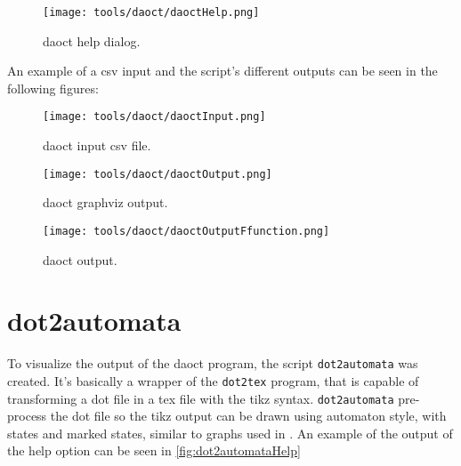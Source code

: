 \begin{figure}[H]
  \centering \texttt{[image: tools/daoct/daoctHelp.png]}
  \caption{daoct help dialog.}
  \label{fig:daoctHelp}
\end{figure}

An example of a csv input and the script's different outputs can
be seen in the following figures:
\vspace{-1cm}
\begin{figure}[H]
\begin{minipage}[H]{0.5\textwidth}
  \centering \texttt{[image: tools/daoct/daoctInput.png]}
  \caption{daoct input csv file.}
  \label{fig:daoctInput}
\end{minipage}
\begin{minipage}[H]{0.5\textwidth}
  \centering \texttt{[image: tools/daoct/daoctOutput.png]}
  \caption{daoct graphviz output.}
  \label{fig:daoctOutput}
\end{minipage}
\end{figure}  


\begin{figure}[H]
  \centering
  \texttt{[image: tools/daoct/daoctOutputFfunction.png]}
  \caption{daoct \ffunction{} output.}
  \label{fig:daoctOutputFfunction}
\end{figure}

% 


% 

% 

\section{dot2automata}
\label{sec:dot2automata}

To visualize the output of the daoct program, the script \verb|dot2automata| was
created. It's basically a wrapper of the \verb|dot2tex| program, that is capable of
transforming a dot file in a tex file with the tikz syntax. \verb|dot2automata|
pre-process the dot file so the tikz output can be drawn using automaton style,
with states and marked states, similar to graphs used in \cite{moreira2018enhanced}.
An example of the output of the help option can be seen in \autoref{fig:dot2automataHelp}

